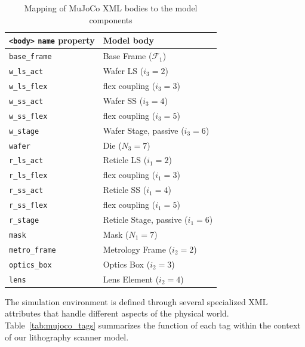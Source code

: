 \begin{table}[htbp]
\centering
\caption{Mapping of MuJoCo XML bodies to the model components}
\label{tab:body_mapping}
\begin{tabular}{ll}
\toprule
\texttt{<body>} \texttt{name} property & Model body \\
\midrule
\texttt{base\_frame}        & Base Frame ($\mathcal{F}_1$) \\
\texttt{w\_ls\_act}         & Wafer LS ($i_3=2$) \\
\texttt{w\_ls\_flex}        & flex coupling ($i_3=3$) \\
\texttt{w\_ss\_act}         & Wafer SS ($i_3=4$) \\
\texttt{w\_ss\_flex}        & flex coupling ($i_3=5$) \\
\texttt{w\_stage}           & Wafer Stage, passive ($i_3=6$) \\
\texttt{wafer}              & Die ($N_3=7$) \\
\texttt{r\_ls\_act}         & Reticle LS ($i_1=2$) \\
\texttt{r\_ls\_flex}        & flex coupling ($i_1=3$) \\
\texttt{r\_ss\_act}         & Reticle SS ($i_1=4$) \\
\texttt{r\_ss\_flex}        & flex coupling ($i_1=5$) \\
\texttt{r\_stage}           & Reticle Stage, passive ($i_1=6$) \\
\texttt{mask}               & Mask ($N_1=7$) \\
\texttt{metro\_frame}       & Metrology Frame ($i_2=2$) \\
\texttt{optics\_box}        & Optics Box ($i_2=3$) \\
\texttt{lens}               & Lens Element ($i_2=4$) \\
\bottomrule
\end{tabular}
\end{table}

The simulation environment is defined through several specialized XML attributes that handle different aspects of the physical world. Table~\ref{tab:mujoco_tags} summarizes the function of each tag within the context of our lithography scanner model.

